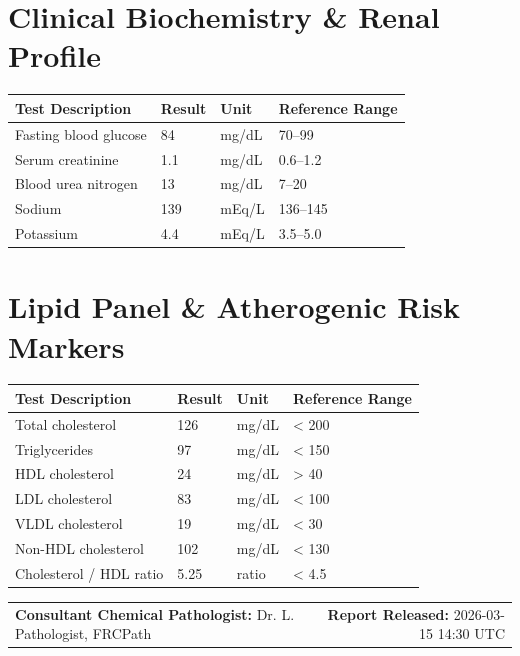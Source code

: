\documentclass[10pt,a4paper]{article}
\begin{document}
\vspace{8pt}

\section*{Clinical Biochemistry \& Renal Profile}

\begin{tabular}{@{} p{6.4cm} p{2.5cm} p{2.5cm} p{3.1cm} @{}}
  \toprule
  \textbf{Test Description} & \textbf{Result} & \textbf{Unit} & \textbf{Reference Range} \\
  \midrule
  Fasting blood glucose & 84 & mg/dL & 70--99 \\
  Serum creatinine & 1.1 & mg/dL & 0.6--1.2 \\
  Blood urea nitrogen & 13 & mg/dL & 7--20 \\
  Sodium & 139 & mEq/L & 136--145 \\
  Potassium & 4.4 & mEq/L & 3.5--5.0 \\
  \bottomrule
\end{tabular}

\vspace{8pt}

\section*{Lipid Panel \& Atherogenic Risk Markers}

\begin{tabular}{@{} p{6.4cm} p{2.5cm} p{2.5cm} p{3.1cm} @{}}
  \toprule
  \textbf{Test Description} & \textbf{Result} & \textbf{Unit} & \textbf{Reference Range} \\
  \midrule
  Total cholesterol & 126 & mg/dL & < 200 \\
  Triglycerides & 97 & mg/dL & < 150 \\
  HDL cholesterol & 24 & mg/dL & > 40 \\
  LDL cholesterol & 83 & mg/dL & < 100 \\
  VLDL cholesterol & 19 & mg/dL & < 30 \\
  Non-HDL cholesterol & 102 & mg/dL & < 130 \\
  Cholesterol / HDL ratio & 5.25 & ratio & < 4.5 \\
  \bottomrule
\end{tabular}

\vspace{14pt}

\noindent
\begin{tabular*}{\textwidth}{@{} l @{\extracolsep{\fill}} r @{}}
  \textbf{Consultant Chemical Pathologist:} Dr. L. Pathologist, FRCPath & \textbf{Report Released:} 2026-03-15 14:30 UTC \\
\end{tabular*}
\end{document}
